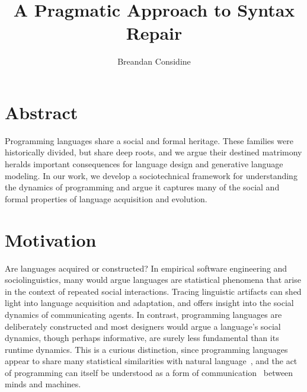 \documentclass[sigplan,screen]{acmart}
\begin{document}
\title{A Pragmatic Approach to Syntax Repair}

\author{Breandan Considine}

\renewcommand{\shortauthors}{Considine}


\maketitle

\section{Abstract}

Programming languages share a social and formal heritage. These families were historically divided, but share deep roots, and we argue their destined matrimony heralds important consequences for language design and generative language modeling. In our work, we develop a sociotechnical framework for understanding the dynamics of programming and argue it captures many of the social and formal properties of language acquisition and evolution.

\section{Motivation}


Are languages acquired or constructed? In empirical software engineering and sociolinguistics, many would argue languages are statistical phenomena that arise in the context of repeated social interactions. Tracing linguistic artifacts can shed light into language acquisition and adaptation, and offers insight into the social dynamics of communicating agents. In contrast, programming languages are deliberately constructed and most designers would argue a language's social dynamics, though perhaps informative, are surely less fundamental than its runtime dynamics. This is a curious distinction, since programming languages appear to share many statistical similarities with natural language~\cite{hindle2016naturalness}, and the act of programming can itself be understood as a form of communication~\cite{demillo1979social} between minds and machines.
\end{document}
